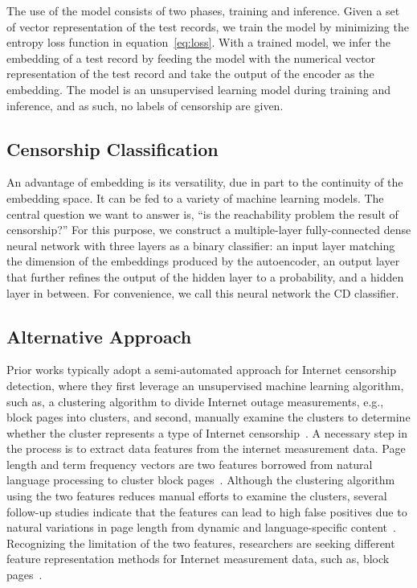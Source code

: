 The use of the model consists of two phases, training and
inference.  Given a set of vector representation of the test records, we train
the model by minimizing the entropy loss function in equation~\eqref{eq:loss}.
With a trained model, we infer the embedding of a test record by feeding the
model with the numerical vector representation of the test record 
and take the output of the
encoder as the embedding.  The model is an unsupervised learning model during
training and inference, and as such, no labels of censorship are given. 



\subsection{Censorship Classification}
\label{sec:design:cd}
An advantage of embedding is its versatility, due in part to the continuity
of the embedding space. It can be fed to a variety of
machine learning models. The central question we want to answer is,
``is the reachability problem the result of censorship?''  
For this purpose, we construct a multiple-layer fully-connected 
dense neural network with three layers as a binary classifier: an input layer
matching the dimension of the embeddings produced by the autoencoder, an output
layer that further refines the output of the hidden layer to a probability, and
a hidden layer in between. For convenience, we call this neural network
the CD classifier. 


\subsection{Alternative Approach}
\label{sec:design:alternate}

Prior works typically adopt a semi-automated approach for Internet censorship 
detection, where they first leverage an unsupervised machine learning algorithm,
such as, a clustering algorithm to divide Internet outage measurements, e.g.,
block pages into clusters, and second, manually examine the clusters to determine
whether the cluster represents a type of Internet 
censorship~\cite{raman_measuring_2020, niaki2020iclab}. A necessary step
in the process is to extract data features from the internet
measurement data. Page length and term frequency vectors are two features
borrowed from natural language processing to cluster block 
pages~\cite{jones2014automated}. Although the clustering algorithm
using the two features reduces manual efforts to examine the clusters,
several follow-up studies indicate that the features can lead to 
high false positives due to natural variations in page length from dynamic
and language-specific content~\cite{yadav2018light, raman_measuring_2020}. 
Recognizing the limitation of the two features, researchers are seeking 
different feature representation methods for Internet measurement data, such as,
block pages~\cite{raman_measuring_2020}.

